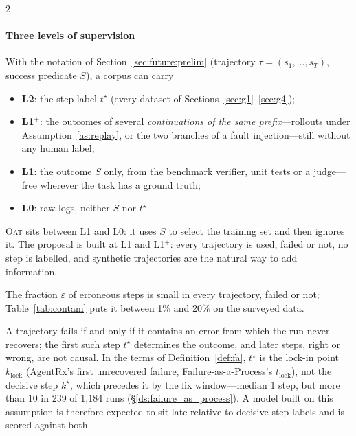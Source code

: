 \begin{multicols}{2}
\paragraph{Three levels of supervision} With the notation of Section~\ref{sec:future:prelim} (trajectory $\tau=(s_1,\dots,s_T)$, success predicate $S$), a corpus can carry
\begin{itemize}[leftmargin=1.1em]
\item \textbf{L2}: the step label $t^\star$ (every dataset of Sections~\ref{sec:g1}--\ref{sec:g4});
\item \textbf{L1$^{+}$}: the outcomes of several \emph{continuations of the same prefix}---rollouts under Assumption~\ref{as:replay}, or the two branches of a fault injection---still without any human label;
\item \textbf{L1}: the outcome $S$ only, from the benchmark verifier, unit tests or a judge---free wherever the task has a ground truth;
\item \textbf{L0}: raw logs, neither $S$ nor $t^\star$.
\end{itemize}
\textsc{Oat} sits between L1 and L0: it uses $S$ to select the training set and then ignores it. The proposal is built at L1 and L1$^{+}$: every trajectory is used, failed or not, no step is labelled, and synthetic trajectories are the natural way to add information.

\begin{assumption}\label{as:sparse}
The fraction $\varepsilon$ of erroneous steps is small in every trajectory, failed or not; Table~\ref{tab:contam} puts it between 1\% and 20\% on the surveyed data.
\end{assumption}
\begin{assumption}[Absorption]\label{as:absorb}
A trajectory fails if and only if it contains an error from which the run never recovers; the first such step $t^\star$ determines the outcome, and later steps, right or wrong, are not causal. In the terms of Definition~\ref{def:fa}, $t^\star$ is the lock-in point $k_{\mathrm{lock}}$ (AgentRx's first unrecovered failure, Failure-as-a-Process's $t_{\mathrm{lock}}$), not the decisive step $k^\star$, which precedes it by the fix window---median 1 step, but more than 10 in 239 of 1,184 runs (\S\ref{ds:failure_as_process}). A model built on this assumption is therefore expected to sit late relative to decisive-step labels and is scored against both.
\end{assumption}


\end{multicols}
